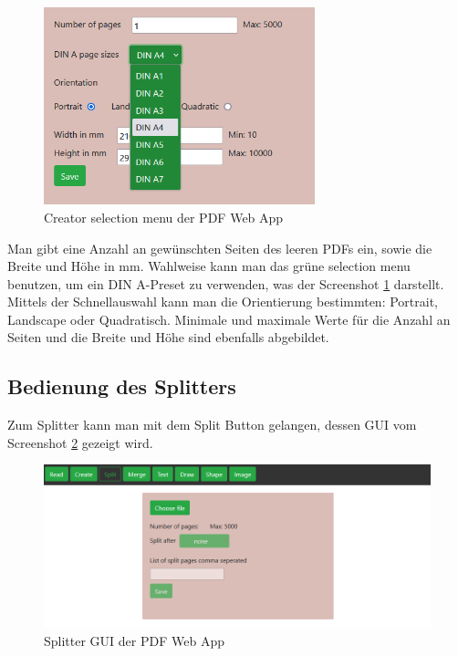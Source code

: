 \begin{figure}[!htbp]
	\centering
	\includegraphics[width=0.7\textwidth]{"images/creator-sel.png"}
	\caption{Creator selection menu der PDF Web App}
	\label{fig:creator-sel}
\end{figure}

Man gibt eine Anzahl an gewünschten Seiten des leeren PDFs ein, sowie die Breite und Höhe in mm. Wahlweise kann man das grüne selection menu benutzen, um ein DIN A-Preset zu verwenden, was der Screenshot \ref{fig:creator-sel} darstellt. Mittels der Schnellauswahl kann man die Orientierung bestimmten: Portrait, Landscape oder Quadratisch. Minimale und maximale Werte für die Anzahl an Seiten und die Breite und Höhe sind ebenfalls abgebildet. 


\subsection{Bedienung des Splitters}
Zum Splitter kann man mit dem Split Button gelangen, dessen GUI vom Screenshot \ref{fig:splitter} gezeigt wird.

\begin{figure}[!htbp]
	\centering
	\includegraphics[width=1\textwidth]{"images/splitter.png"}
	\caption{Splitter GUI der PDF Web App}
	\label{fig:splitter}
\end{figure}

